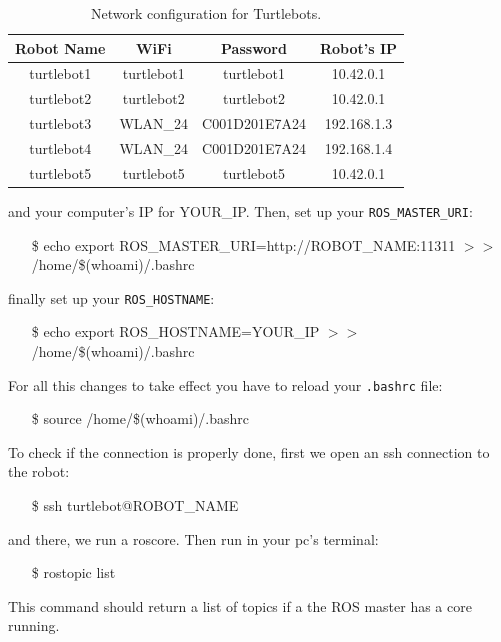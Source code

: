 \documentclass[a4paper,10pt]{article}
\begin{document}
\begin{table}[h!]
	\centering
	\begin{tabular}{|c|c|c|c|}
		\hline
		Robot Name & WiFi & Password & Robot's IP \\ \hline
		turtlebot1 & turtlebot1 & turtlebot1 & 10.42.0.1 \\ \hline
		turtlebot2 & turtlebot2 & turtlebot2 & 10.42.0.1 \\ \hline
		turtlebot3 & WLAN\_24 & C001D201E7A24 & 192.168.1.3 \\ \hline
		turtlebot4 & WLAN\_24 & C001D201E7A24 & 192.168.1.4 \\ \hline
		turtlebot5 & turtlebot5 & turtlebot5 & 10.42.0.1 \\ \hline
	\end{tabular}
    \caption{Network configuration for Turtlebots. }
    \label{tab:ips}
\end{table}
and your computer's IP for YOUR\_IP. Then, set up your \texttt{ROS\_MASTER\_URI}:
\begin{shaded}
	\begin{itemize}
		\item[\$] echo export ROS\_MASTER\_URI=http://ROBOT\_NAME:11311 $>>$ /home/\$(whoami)/.bashrc
	\end{itemize}
\end{shaded}
finally set up your \texttt{ROS\_HOSTNAME}:
\begin{shaded}
	\begin{itemize}
		\item[\$] echo export ROS\_HOSTNAME=YOUR\_IP $>>$ /home/\$(whoami)/.bashrc
	\end{itemize}
\end{shaded}
For all this changes to take effect you have to reload your \texttt{.bashrc} file:
\begin{shaded}
	\begin{itemize}
		\item[\$] source /home/\$(whoami)/.bashrc
	\end{itemize}
\end{shaded}

To check if the connection is properly done, first we open an ssh connection to the robot:
\begin{shaded}
	\begin{itemize}
		\item[\$] ssh turtlebot@ROBOT\_NAME
	\end{itemize}
\end{shaded}
and there, we run a roscore. Then run in your pc's terminal:
\begin{shaded}
	\begin{itemize}
		\item[\$] rostopic list
	\end{itemize}
\end{shaded}
This command should return a list of topics if a the ROS master has a core running.
\end{document}
